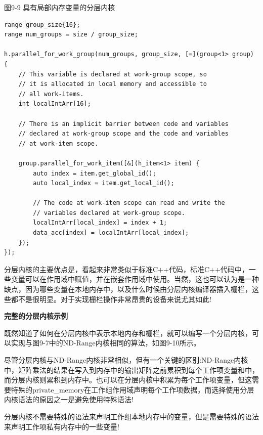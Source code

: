\hspace*{\fill} \par %
图9-9 具有局部内存变量的分层内核
\begin{lstlisting}[caption={}]
range group_size{16};
range num_groups = size / group_size;

h.parallel_for_work_group(num_groups, group_size, [=](group<1> group) {
	// This variable is declared at work-group scope, so
	// it is allocated in local memory and accessible to
	// all work-items.
	int localIntArr[16];
	
	// There is an implicit barrier between code and variables
	// declared at work-group scope and the code and variables
	// at work-item scope.
	
	group.parallel_for_work_item([&](h_item<1> item) {
		auto index = item.get_global_id();
		auto local_index = item.get_local_id();
		
		// The code at work-item scope can read and write the
		// variables declared at work-group scope.
		localIntArr[local_index] = index + 1;
		data_acc[index] = localIntArr[local_index];
	});
});
\end{lstlisting}

分层内核的主要优点是，看起来非常类似于标准C++代码，标准C++代码中，一些变量可以在作用域中赋值，并在嵌套作用域中使用。当然，这也可以认为是一种缺点，因为哪些变量在本地内存中，以及什么时候由分层内核编译器插入栅栏，这些都不是很明显。对于实现栅栏操作非常昂贵的设备来说尤其如此!\par

\hspace*{\fill} \par %
\textbf{完整的分层内核示例}

既然知道了如何在分层内核中表示本地内存和栅栏，就可以编写一个分层内核，可以实现与图9-7中的ND-Range内核相同的算法，如图9-10所示。\par

尽管分层内核与ND-Range内核非常相似，但有一个关键的区别:ND-Range内核中，矩阵乘法的结果在写入到内存中的输出矩阵之前累积到每个工作项变量和中，而分层内核则累积到内存中。也可以在分层内核中积累为每个工作项变量，但这需要特殊的private\_memory在工作组作用域声明每个工作项数据，而选择使用分层内核语法的原因之一是避免使用特殊语法!\par

\begin{tcolorbox}[colback=red!5!white,colframe=red!75!black]
分层内核不需要特殊的语法来声明工作组本地内存中的变量，但是需要特殊的语法来声明工作项私有内存中的一些变量!
\end{tcolorbox}

